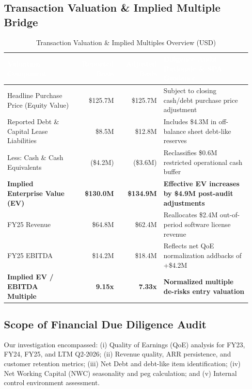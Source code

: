 \documentclass[10pt,a4paper,oneside]{scrreprt}
\newcommand{\tablehdr}[1]{\fontseries{b}\selectfont\textcolor{white}{#1}}
\begin{document}
\subsection*{Transaction Valuation \& Implied Multiple Bridge}
\begin{table}[H]
\centering
\fontsize{8.5}{10.5}\selectfont
\renewcommand{\arraystretch}{1.02}
\begin{tabularx}{\textwidth}{L r r X}
\hline
{}
\tablehdr{Valuation Component} & \tablehdr{Reported Basis} & \tablehdr{Adjusted Basis} & \tablehdr{Diligence Audit Rationale \& SPA Guidance} \\
\hline
Headline Purchase Price (Equity Value) & \$125.7M & \$125.7M & Subject to closing cash/debt purchase price adjustment \\
Reported Debt \& Capital Lease Liabilities & \$8.5M & \$12.8M & Includes \$4.3M in off-balance sheet debt-like reserves \\
Less: Cash \& Cash Equivalents & (\$4.2M) & (\$3.6M) & Reclassifies \$0.6M restricted operational cash buffer \\
\textbf{Implied Enterprise Value (EV)} & \textbf{\$130.0M} & \textbf{\$134.9M} & \textbf{Effective EV increases by \$4.9M post-audit adjustments} \\
FY25 Revenue & \$64.8M & \$62.4M & Reallocates \$2.4M out-of-period software license revenue \\
FY25 EBITDA & \$14.2M & \$18.4M & Reflects net QoE normalization addbacks of +\$4.2M \\
\textbf{Implied EV / EBITDA Multiple} & \textbf{9.15x} & \textbf{7.33x} & \textbf{Normalized multiple de-risks entry valuation} \\
\hline
\end{tabularx}
\caption{Transaction Valuation \& Implied Multiples Overview (USD)}
\end{table}

\vspace{-0.2cm}
\subsection*{Scope of Financial Due Diligence Audit}
Our investigation encompassed: (i) Quality of Earnings (QoE) analysis for FY23, FY24, FY25, and LTM Q2-2026; (ii) Revenue quality, ARR persistence, and customer retention metrics; (iii) Net Debt and debt-like item identification; (iv) Net Working Capital (NWC) seasonality and peg calculation; and (v) Internal control environment assessment.
\end{document}
